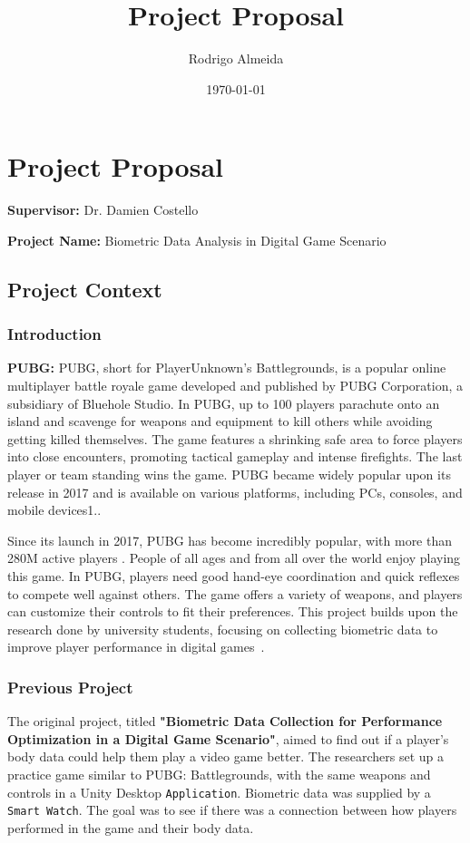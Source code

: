 \documentclass{report}
\title{Project Proposal}
\author{Rodrigo Almeida}
\date{\today}
\begin{document}
\maketitle
\chapter{Project Proposal}
\textbf{Supervisor:} Dr. Damien Costello\par
\noindent\textbf{Project Name:} Biometric Data Analysis in Digital Game Scenario

\section*{Project Context}
\subsection*{Introduction}
\par

\textbf{PUBG:} PUBG, short for PlayerUnknown's Battlegrounds, is a popular online multiplayer battle royale game developed and published by PUBG Corporation, a subsidiary of Bluehole Studio. In PUBG, up to 100 players parachute onto an island and scavenge for weapons and equipment to kill others while avoiding getting killed themselves. The game features a shrinking safe area to force players into close encounters, promoting tactical gameplay and intense firefights. The last player or team standing wins the game. PUBG became widely popular upon its release in 2017 and is available on various platforms, including PCs, consoles, and mobile devices1.\cite{PUBG}.
\par 
Since its launch in 2017, PUBG has become incredibly popular, with more than 280M active players \cite{PUBG_users}. People of all ages and from all over the world enjoy playing this game. In PUBG, players need good hand-eye coordination and quick reflexes to compete well against others. The game offers a variety of weapons, and players can customize their controls to fit their preferences. This project builds upon the research done by university students, focusing on collecting biometric data to improve player performance in digital games~\cite{PUBG}.

\subsection*{Previous Project}
The original project, titled \textbf{"Biometric Data Collection for Performance Optimization in a Digital Game Scenario"}, aimed to find out if a player's body data could help them play a video game better. The researchers set up a practice game similar to PUBG: Battlegrounds, with the same weapons and controls in a Unity Desktop {\tt Application}. Biometric data was supplied by a {\tt Smart Watch}. The goal was to see if there was a connection between how players performed in the game and their body data.
\end{document}
